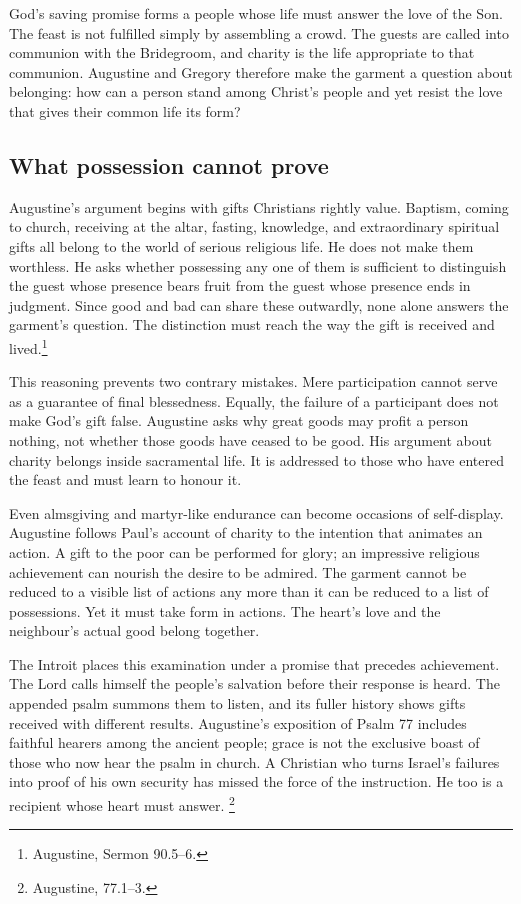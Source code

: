 \clearpage
{}

God's saving promise forms a people whose life must answer the love of
the Son. The feast is not fulfilled simply by assembling a crowd.
The guests are called into communion with the Bridegroom, and charity
is the life appropriate to that communion. Augustine and Gregory
therefore make the garment a question about belonging: how can a
person stand among Christ's people and yet resist the love that gives
their common life its form?

\subsection{What possession cannot prove}

Augustine's argument begins with gifts Christians rightly value.
Baptism, coming to church, receiving at the altar, fasting, knowledge,
and extraordinary spiritual gifts all belong to the world of serious
religious life. He does not make them worthless. He asks whether
possessing any one of them is sufficient to distinguish the guest
whose presence bears fruit from the guest whose presence ends in
judgment. Since good and bad can share these outwardly, none alone
answers the garment's question. The distinction must reach the way
the gift is received and lived.\footnote{Augustine, Sermon 90.5--6.}

This reasoning prevents two contrary mistakes. Mere participation
cannot serve as a guarantee of final blessedness. Equally, the
failure of a participant does not make God's gift false. Augustine
asks why great goods may profit a person nothing, not whether those
goods have ceased to be good. His argument about charity belongs
inside sacramental life. It is addressed to those who have entered
the feast and must learn to honour it.

Even almsgiving and martyr-like endurance can become occasions of
self-display. Augustine follows Paul's account of charity to the
intention that animates an action. A gift to the poor can be performed
for glory; an impressive religious achievement can nourish the
desire to be admired. The garment cannot be reduced to a visible
list of actions any more than it can be reduced to a list of
possessions. Yet it must take form in actions. The heart's love and
the neighbour's actual good belong together.

The Introit places this examination under a promise that precedes
achievement. The Lord calls himself the people's salvation before
their response is heard. The appended psalm summons them to listen,
and its fuller history shows gifts received with different results.
Augustine's exposition of Psalm 77 includes faithful hearers among
the ancient people; grace is not the exclusive boast of those who
now hear the psalm in church. A Christian who turns Israel's failures
into proof of his own security has missed the force of the
instruction. He too is a recipient whose heart must answer.
\footnote{Augustine,  77.1--3.}

